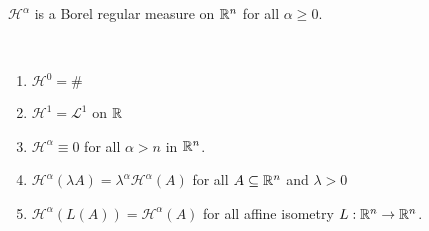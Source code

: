 \begin{theorem}
$\mathcal{H}^\alpha$ is a Borel regular measure on $\mathbb{R}^n$ for all $\alpha \geq
0$.
\end{theorem}

\begin{theorem}~
\begin{enumerate}[(1)]
\item $\mathcal{H}^0 = \#$ 
\item $\mathcal{H}^1 = \mathcal{L}^1$ on $\mathbb{R}$ 
\item $\mathcal{H}^\alpha \equiv 0$ for all $\alpha > n$ in $\mathbb{R}^n$. 
\item $\mathcal{H}^\alpha(\lambda A) = \lambda^\alpha \mathcal{H}^\alpha(A)$ for
all $A \subseteq \mathbb{R}^n$ and $\lambda > 0$
\item $\mathcal{H}^\alpha(L(A)) = \mathcal{H}^\alpha(A)$ for all affine
isometry $L : \mathbb{R}^n \to \mathbb{R}^n$.
\end{enumerate}
\end{theorem}

